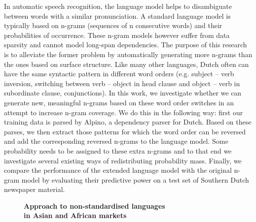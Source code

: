 \documentclass[10pt, a4paper, twopage, headinclude, footinclude, BCOR5mm]{scrartcl}
\begin{document}
\noindent
In automatic speech recognition, the language model helps to disambiguate between words with a similar pronunciation. A standard language model is typically based on n-grams (sequences of n consecutive words) and their probabilities of occurrence. These n-gram models however suffer from data sparsity and cannot model long-span dependencies. The purpose of this research is to alleviate the former problem by automatically generating more n-grams than the ones based on surface structure.  Like many other languages, Dutch often can have the same syntactic pattern in different word orders (e.g. subject – verb inversion, switching between verb – object in head clause and object – verb in subordinate clause, conjunctions). In this work, we investigate whether we can generate new, meaningful n-grams based on these word order switches in an attempt to increase n-gram coverage. We do this in the following way: first our training data is parsed by Alpino, a dependency parser for Dutch. Based on these parses, we then extract those patterns for which the word order can be reversed and add the corresponding reversed n-grams to the language model. Some probability needs to be assigned to these extra n-grams and to that end we investigate several existing ways of redistributing probability mass. Finally, we compare the performance of the extended language model with the original n-gram model by evaluating their predictive power on a test set of Southern Dutch newspaper material.


\newpage

\begin{figure}[t!]
\centering
\large\textbf{Approach to non-standardised languages \\ in Asian and African markets}
\vspace*{0.5cm}
\end{figure}


        \begin{table}[t!]
    \end{table}
\end{document}
